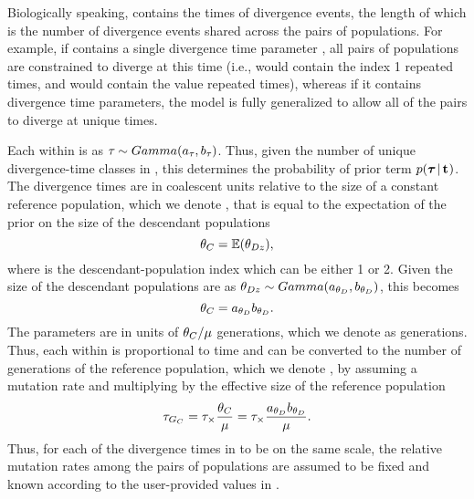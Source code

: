 Biologically speaking, \divTimeVector contains the times of divergence events,
the length of which \divTimeNum is the number of divergence events shared across
the \npairs{} pairs of populations.
For example, if \divTimeVector contains a single divergence time parameter
, all \npairs{} pairs of populations are constrained to diverge at
this time (i.e., \divTimeIndexVector would contain the index 1 repeated
\npairs{} times, and \divTimeMapVector would contain the value 
repeated \npairs{} times), whereas if it contains \npairs{} divergence time
parameters, the model is fully generalized to allow all of the pairs to diverge
at unique times.

\begin{linenomath}
Each \divTime{} within \divTimeVector is \iid as $\tau_{} \sim
Gamma(a_{\tau_{}}, b_{\tau_{}})$.
Thus, given the number of unique divergence-time classes in
\divTimeIndexVector, this determines the probability of prior term
$p(\boldsymbol{\tau_{}} \,|\, \mathbf{t_{}})$.
The divergence times are in coalescent units relative to the size of
a constant reference population, which we denote , that is equal to
the expectation of the prior on the size of the descendant populations
\begin{equation}
    \myTheta{C} = \mathbb{E}(\dThetas),
    \label{eq:thetaC}
\end{equation}
where \popIndex is the descendant-population index which can be either 1 or 2.
Given the size of the descendant populations are \iid as
$\dThetas \sim Gamma(\gammaShape{\descendantTheta{}{}},
\gammaScale{\descendantTheta{}{}})$,
this becomes
\begin{equation}
    \myTheta{C} = \gammaShape{\descendantTheta{}{}}\gammaScale{\descendantTheta{}{}}.
    \label{eq:thetaCGamma}
\end{equation}
The \divTime{} parameters are in units of $\theta_{C}/\mu$
generations, which we denote as \globalcoalunit generations.
Thus, each \divTime{} within \divTimeVector is proportional to time and can be
converted to the number of generations of the reference population, which we
denote , by assuming a mutation rate and multiplying by the
effective size of the reference population
\begin{equation}
    \divTime{G_C} = \divTime \times \frac{\myTheta{C}}{\mutationRate} = \divTime
    \times \frac{
    \gammaShape{\descendantTheta{}{}}\gammaScale{\descendantTheta{}{}}}
    {\mutationRate}.
    \label{eq:divTimeGenerations}
\end{equation}
Thus, for each of the divergence times in \divTimeVector to be on the same
scale, the relative mutation rates among the pairs of populations are assumed
to be fixed and known according to the user-provided values in
\mutationRateScalarConstantVector.
\end{linenomath}

